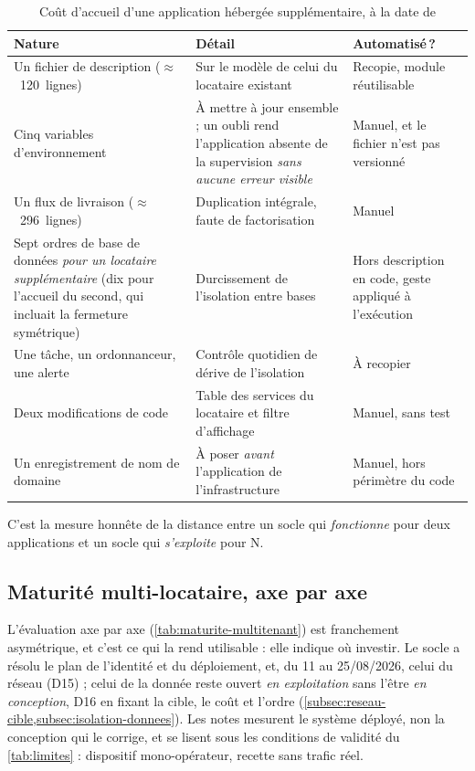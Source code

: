 \begin{table}[!htbp]
\caption[Coût d'accueil d'une application supplémentaire]{Coût d'accueil d'une application hébergée supplémentaire, à la date de \dateref}
\label{tab:cout-onboarding}
\centering
\footnotesize
\setlength{\tabcolsep}{3pt}
\begin{tabular}{|P{3.4cm}|P{7.0cm}|P{4.9cm}|}
\hline
\textbf{Nature} & \textbf{Détail} & \textbf{Automatisé\,?} \\
\hline
Un fichier de description ($\approx$~120~lignes) & Sur le modèle de celui du locataire existant &
Recopie, module réutilisable \\ \hline
Cinq variables d'environnement & À mettre à jour ensemble ; un oubli rend l'application absente
de la supervision \emph{sans aucune erreur visible} & Manuel, et le fichier n'est pas versionné \\ \hline
Un flux de livraison ($\approx$~296~lignes) & Duplication intégrale, faute de factorisation &
Manuel \\ \hline
Sept ordres de base de données \emph{pour un locataire supplémentaire} (dix pour l'accueil du
second, qui incluait la fermeture symétrique) & Durcissement de l'isolation entre bases & Hors
description en code, geste appliqué à l'exécution \\ \hline
Une tâche, un ordonnanceur, une alerte & Contrôle quotidien de dérive de l'isolation & À recopier \\ \hline
Deux modifications de code & Table des services du locataire et filtre d'affichage & Manuel,
sans test \\ \hline
Un enregistrement de nom de domaine & À poser \emph{avant} l'application de l'infrastructure &
Manuel, hors périmètre du code \\
\hline
\end{tabular}
\end{table}

C'est la mesure honnête de la distance entre un socle qui \emph{fonctionne} pour deux applications
et un socle qui \emph{s'exploite} pour N.

\subsection{Maturité multi-locataire, axe par axe}

L'évaluation axe par axe (\cref{tab:maturite-multitenant}) est franchement asymétrique, et
c'est ce qui la rend utilisable : elle indique où investir. Le socle a résolu le plan de l'identité
et du déploiement, et, du 11 au 25/08/2026, celui du réseau (D15) ; celui de la donnée reste ouvert
\emph{en exploitation} sans l'être \emph{en conception}, D16 en fixant la cible, le coût et l'ordre
(\cref{subsec:reseau-cible,subsec:isolation-donnees}). Les notes mesurent le système déployé, non
la conception qui le corrige, et se lisent sous les conditions de validité du \cref{tab:limites} :
dispositif mono-opérateur, recette sans trafic réel.

